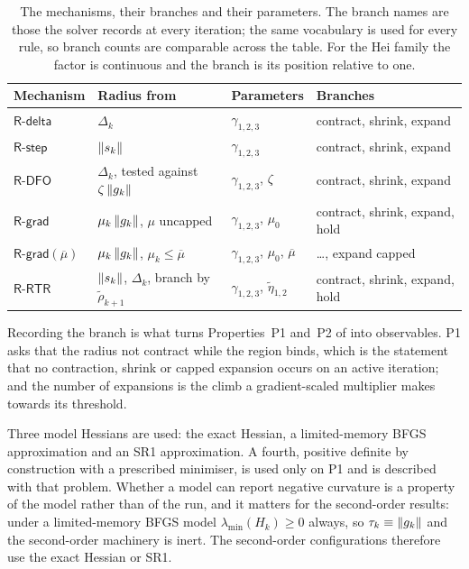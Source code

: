 \documentclass[11pt]{article}
\theoremstyle{plain}
\theoremstyle{definition}
\theoremstyle{remark}
\numberwithin{equation}{section}
\newcommand{\Rdelta}{\textsf{R-delta}}
\newcommand{\Rstep}{\textsf{R-step}}
\newcommand{\Rdfo}{\textsf{R-DFO}}
\newcommand{\Rgrad}{\textsf{R-grad}}
\newcommand{\Rrtr}{\textsf{R-RTR}}
\begin{document}
\begin{table}[htbp]
  \centering
  \caption{The mechanisms, their branches and their parameters. The branch names
           are those the solver records at every iteration; the same vocabulary
           is used for every rule, so branch counts are comparable across the
           table. For the Hei family the factor is continuous and the branch is
           its position relative to one.}
  \label{tab: mechanisms implemented}
  \small
  \begin{tabular}{@{}llll@{}}
    \toprule
    Mechanism & Radius from & Parameters & Branches \\
    \midrule
    $\Rdelta$      & $\Delta_k$              & $\gamma_{1,2,3}$
                   & contract, shrink, expand \\
    $\Rstep$       & $\left \lVert s_k \right \rVert$            & $\gamma_{1,2,3}$
                   & contract, shrink, expand \\
    $\Rdfo$        & $\Delta_k$, tested against $\zeta\left \lVert g_k \right \rVert$ & $\gamma_{1,2,3}$, $\zeta$
                   & contract, shrink, expand \\
    $\Rgrad$       & $\mu_k\left \lVert g_k \right \rVert$, $\mu$ uncapped & $\gamma_{1,2,3}$, $\mu_0$
                   & contract, shrink, expand, hold \\
    $\Rgrad(\overline{\mu})$ & $\mu_k\left \lVert g_k \right \rVert$, $\mu_k \leq \overline{\mu}$
                   & $\gamma_{1,2,3}$, $\mu_0$, $\overline{\mu}$
                   & \dots, expand capped \\
    $\Rrtr$        & $\left \lVert s_k \right \rVert$, $\Delta_k$, branch by $\widetilde\rho_{k+1}$
                   & $\gamma_{1,2,3}$, $\widetilde\eta_{1,2}$
                   & contract, shrink, expand, hold \\
    \bottomrule
  \end{tabular}
\end{table}

Recording the branch is what turns Properties~P1 and~P2 of \PartII{} into
observables. P1 asks that the radius not contract while the region binds, which
is the statement that no contraction, shrink or capped expansion occurs on an
active iteration; and the number of expansions is the climb a gradient-scaled
multiplier makes towards its threshold.

Three model Hessians are used: the exact Hessian, a limited-memory BFGS
approximation and an SR1 approximation. A fourth, positive definite by
construction with a prescribed minimiser, is used only on P1 and is described
with that problem. Whether a model can report negative curvature is a property of
the model rather than of the run, and it matters for the second-order results:
under a limited-memory BFGS model $\lambda_{\min}(H_k) \geq 0$ always, so
$\tau_k \equiv \left \lVert g_k \right \rVert$ and the second-order machinery is inert. The
second-order configurations therefore use the exact Hessian or SR1.
\end{document}
